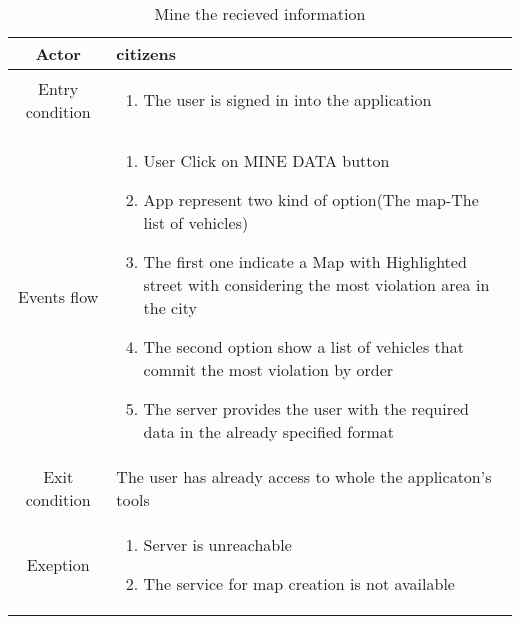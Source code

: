 \documentclass{article}
\begin{document}
		\begin{table} [H]
		\begin{center}
		\caption{Mine the recieved information}
		\begin{tabular}{|c|p{8cm}|}
			\hline
			Actor&citizens\\
			\hline
			Entry condition& \begin{enumerate}
								\item The user is signed in into the application
							\end{enumerate}\\
			\hline
			 Events flow& \begin{enumerate}
							\item User Click on MINE DATA button			
							\item App represent two kind of option(The map-The list of vehicles)
							\item The first one indicate a Map with Highlighted street with considering the most violation area in the city
							\item The second option show a list of vehicles that commit the most violation by order %
							\item The server provides the user with the required data in the already specified format
						\end{enumerate}\\
			\hline
			Exit condition & The user has already access to whole the applicaton's tools\\
			\hline
			Exeption& \begin{enumerate}
						\item Server is unreachable
						\item The service for map creation is not available
					\end{enumerate}\\
			\hline
		\end{tabular}
		\end{center}
		\end{table} 
		
\end{document}
